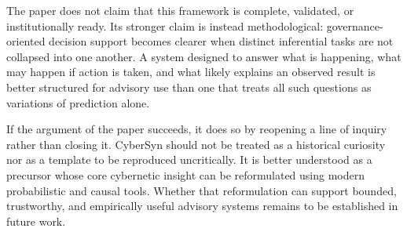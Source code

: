 \documentclass[11pt]{article}
\begin{document}
The paper does not claim that this framework is complete, validated, or institutionally ready. Its stronger claim is instead methodological: governance-oriented decision support becomes clearer when distinct inferential tasks are not collapsed into one another. A system designed to answer what is happening, what may happen if action is taken, and what likely explains an observed result is better structured for advisory use than one that treats all such questions as variations of prediction alone.

If the argument of the paper succeeds, it does so by reopening a line of inquiry rather than closing it. CyberSyn should not be treated as a historical curiosity nor as a template to be reproduced uncritically. It is better understood as a precursor whose core cybernetic insight can be reformulated using modern probabilistic and causal tools. Whether that reformulation can support bounded, trustworthy, and empirically useful advisory systems remains to be established in future work.



\end{document}
